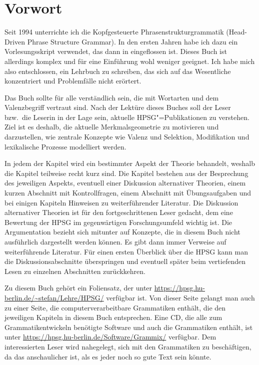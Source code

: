 
\chapter*{Vorwort}

\begin{sloppypar}
Seit 1994 unterrichte ich die Kopfgesteuerte Phrasenstrukturgrammatik (Head-Driven Phrase
Structure Grammar). In den ersten Jahren habe ich dazu ein Vorlesungsskript verwendet, das
dann in  eingeflossen ist. Dieses Buch ist allerdings komplex und
für eine Einführung wohl weniger geeignet. Ich habe mich also entschlossen, ein Lehrbuch zu
schreiben, das sich auf das Wesentliche konzentriert und Problemfälle nicht erörtert.
\end{sloppypar}

Das Buch sollte für alle verständlich sein, die mit Wortarten und dem Valenzbegriff vertraut
sind. Nach der Lektüre dieses Buches soll der Leser bzw.\ die Leserin in der Lage sein, aktuelle
HPSG"=Publikationen zu verstehen. Ziel ist es deshalb, die aktuelle Merkmalsgeometrie zu motivieren
und darzustellen, wie zentrale Konzepte wie Valenz und Selektion, Modifikation und lexikalische
Prozesse modelliert werden.

In jedem der Kapitel wird ein bestimmter Aspekt der Theorie behandelt, weshalb die Kapitel teilweise
recht kurz sind. Die Kapitel bestehen aus der Besprechung des jeweiligen Aspekts, eventuell einer
Diskussion alternativer Theorien, einem kurzen Abschnitt mit Kontrollfragen, einem Abschnitt
mit Übungsaufgaben und bei einigen Kapiteln Hinweisen zu weiterführender Literatur. Die Diskussion
alternativer Theorien ist für den fortgeschrittenen Leser gedacht, 
dem eine Bewertung der HPSG im gegenwärtigen Forschungsumfeld wichtig ist. Die Argumentation
bezieht sich mitunter auf Konzepte, die in diesem Buch nicht ausführlich dargestellt werden können.
Es gibt dann immer Verweise auf weiterführende Literatur. Für einen ersten Überblick über
die HPSG kann man die Diskussionsabschnitte überspringen und eventuell später beim vertiefenden
Lesen zu einzelnen Abschnitten zurückkehren.

\begin{sloppy}
Zu diesem Buch gehört ein Foliensatz, der unter 
\url{https://hpsg.hu-berlin.de/~stefan/Lehre/HPSG/}
verfügbar ist. Von dieser Seite gelangt man auch zu einer Seite, die computerverarbeitbare
Grammatiken enthält, die den jeweiligen Ka\-pi\-teln in diesem Buch entsprechen. Eine CD, die
alle zum Grammatikentwickeln benötigte Software und auch die Grammatiken enthält, ist unter
\url{https://hpsg.hu-berlin.de/Software/Grammix/} verfügbar. Dem interessierten Leser
wird nahegelegt, sich mit den Grammatiken zu beschäftigen, da das anschaulicher ist,
als es jeder noch so gute Text sein könnte.
\end{sloppy}

